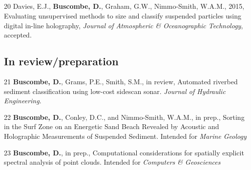\documentclass[margin,line]{resume}
\begin{document}
\begin{resume}
\begin{footnotesize}
\begin{list1}
	\end{list1}
	
	\subsection{}
	\begin{list1}
	
	\item[20] Davies, E.J., {\bf Buscombe, D.}, Graham, G.W., Nimmo-Smith, W.A.M., 2015, Evaluating unsupervised methods to size and classify suspended particles using digital in-line holography, {\sl Journal of Atmospheric \& Oceanographic Technology}, accepted.

	\end{list1}

	\subsection{\mysidestyle In review/preparation}
	\begin{list1}

	\item[21] {\bf Buscombe, D.}, Grams, P.E., Smith, S.M., in review, Automated riverbed sediment classification using low-cost sidescan sonar. {\sl Journal of Hydraulic Engineering}.\\

	\item[22] {\bf 	Buscombe, D.}, Conley, D.C., and Nimmo-Smith, W.A.M., in prep., Sorting in the Surf Zone on an Energetic Sand Beach Revealed by Acoustic and Holographic Measurements of Suspended Sediment. Intended for {\sl Marine Geology}\\

	\item[23] {\bf 	Buscombe, D.}, in prep., Computational considerations for spatially explicit spectral analysis of point clouds. Intended for {\sl Computers \& Geosciences}



	\end{list1}
        

\end{footnotesize}
\end{resume}
\end{document}
